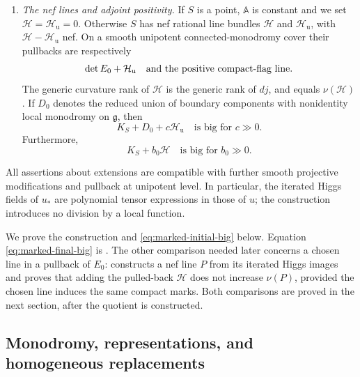 \begin{proposition}
\begin{enumerate}
kinds of marks use disjoint complex simple factors.  Every rational
simple factor of $G$ has a complex factor acting nontrivially on $J$.
The full Lie-period map together with $j_{\mathrm u}$ is generically
immersive on $S^\circ$.
\item \emph{The nef lines and adjoint positivity.} If $S$ is a point, $\mathbb A$ is constant and we set
$\mathcal H=\mathcal H_{\mathrm u}=0$.  Otherwise $S$ has
nef rational line bundles $\mathcal H$ and $\mathcal H_{\mathrm u}$,
with $\mathcal H-\mathcal H_{\mathrm u}$ nef.  On a smooth unipotent
connected-monodromy cover their pullbacks are respectively
\[
 \det E_0+\mathcal H_{\mathrm u}
 \quad\hbox{and the positive compact-flag line.}
\]
The generic curvature rank of $\mathcal H$ is the generic rank of
$dj$, and equals $\nu(\mathcal H)$.  If $D_0$ denotes the reduced
union of boundary components with nonidentity local monodromy on
$\mathfrak g$, then
\begin{equation}\label{eq:marked-initial-big}
 K_S+D_0+c\mathcal H_{\mathrm u}\quad\text{is big for }c\gg0.
\end{equation}
Furthermore,
\begin{equation}\label{eq:marked-final-big}
 K_S+b_0\mathcal H\quad\text{is big for }b_0\gg0.
\end{equation}
\end{enumerate}
All assertions about extensions are compatible with further smooth
projective modifications and pullback at unipotent level.  In
particular, the iterated Higgs fields of $u_*$ are polynomial tensor
expressions in those of $u$; the construction introduces no division
by a local function.
\end{proposition}

We prove the construction and \eqref{eq:marked-initial-big} below.
Equation \eqref{eq:marked-final-big} is
.  The other comparison needed later concerns
a chosen line in a pullback of $E_0$:  constructs
a nef line $P$ from its iterated Higgs images and proves that adding
the pulled-back $\mathcal H$ does not increase $\nu(P)$, provided the
chosen line induces the same compact marks.  Both comparisons are
proved in the next section, after the quotient is constructed.

\subsection{Monodromy, representations, and homogeneous replacements}

